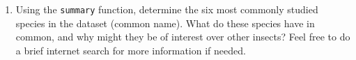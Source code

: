 \documentclass[
]{article}
\newenvironment{Shaded}{\begin{snugshade}}{\end{snugshade}}
\newcommand{\CommentTok}[1]{\textcolor[rgb]{0.56,0.35,0.01}{\textit{#1}}}
\newcommand{\FunctionTok}[1]{\textcolor[rgb]{0.00,0.00,0.00}{#1}}
\newcommand{\NormalTok}[1]{#1}
\newcommand{\SpecialCharTok}[1]{\textcolor[rgb]{0.00,0.00,0.00}{#1}}
\providecommand{\tightlist}{%
  \setlength{\itemsep}{0pt}\setlength{\parskip}{0pt}}
\begin{document}
\begin{enumerate}
\def\labelenumi{\arabic{enumi}.}
\setcounter{enumi}{6}
\tightlist
\item
  Using the \texttt{summary} function, determine the six most commonly
  studied species in the dataset (common name). What do these species
  have in common, and why might they be of interest over other insects?
  Feel free to do a brief internet search for more information if
  needed.
\end{enumerate}

\begin{Shaded}
\end{Shaded}
\end{document}
